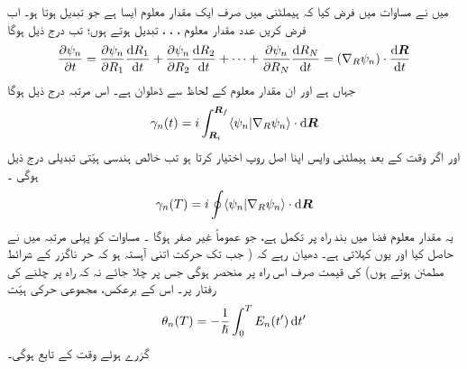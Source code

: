  میں نے مساوات    میں فرض کیا کہ ہیملٹنی میں صرف ایک مقدار معلوم ایسا ہے جو تبدیل ہوتا ہو۔ اب  فرض کریں  عدد مقدار معلوم ،  ، ،  تبدیل ہوتے ہوں؛  تب درج ذیل ہوگا 
\begin{align}
\frac{\partial \psi_n}{\partial t} = \frac{\partial \psi_n}{\partial R_1} \frac{\dif R_1}{\dif t} + \frac{\partial \psi_n}{\partial R_2} \frac{\dif R_2}{\dif t} + \cdots + \frac{\partial \psi_n}{\partial R_N} \frac{\dif R_N}{\dif t} = (\nabla_R \psi_n) \cdot \frac{\dif \kvec{R}}{\dif t}
\end{align} 
جہاں  ہے اور  ان مقدار معلوم کے لحاظ سے ڈھلوان ہے۔  اس مرتبہ درج ذیل ہوگا 
\begin{align}
\gamma_n (t) = i \int_{\kvec{R}_i}^{\kvec{R}_f} \langle \psi_n | \nabla_R \psi_n \rangle \cdot \dif \kvec{R}
\end{align}
اور اگر وقت  کے بعد ہیملٹنی واپس اپنا  اصل روپ اختیار کرتا ہو تب خالص  ہندسی ہیّتی تبدیلی درج ذیل ہوگی ۔
\begin{align}\label{مساوات_حر_غیر_صفر_لکیری_تکمل}
\gamma_n (T) = i \oint \langle \psi_n | \nabla_R \psi_n \rangle \cdot \dif \kvec{R}
\end{align}
یہ مقدار معلوم   فضا میں  بند راہ پر    تکمل ہے، جو عموماً غیر صفر ہوگا ۔ مساوات    کو پہلی مرتبہ    میں    نے حاصل کیا اور یوں    کہلاتی ہے۔ دھیان رہے  کہ ( جب تک  حرکت  اتنی آہستہ ہو کہ  حر ناگزر کے شرائط مطمئن ہوتے ہوں)   کی قیمت صرف اس راہ پر منحصر ہوگی جس پر چلا جائے نہ کہ راہ پر چلنے کی رفتار پر۔  اس کے برعکس،  مجموعی حرکی ہیّت 
\begin{align*}
\theta_n (T) = - \frac{1}{\hslash} \int_0^T E_n (t') \dif t'
\end{align*}
گزرے ہوئے وقت کے  تابع ہوگی۔

